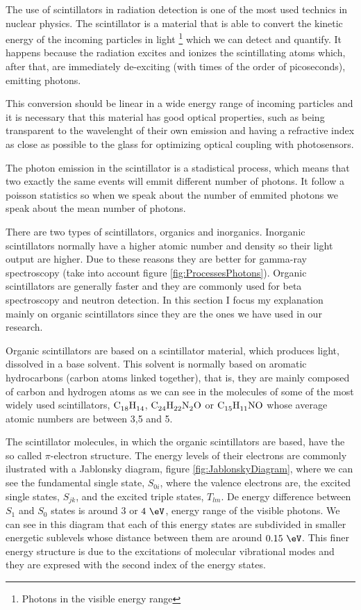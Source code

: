 The use of scintillators in radiation detection is one of the most used technics in nuclear physics. The scintillator is a material that is able to convert the kinetic energy of the incoming particles in light \footnote{Photons in the visible energy range} which we can detect and quantify. It happens because the radiation excites and ionizes the scintillating atoms which, after that, are immediately de-exciting (with times of the order of picoseconds), emitting photons.

This conversion should be linear in a wide energy range of incoming particles and it is necessary that this material has good optical properties, such as being transparent to the wavelenght of their own emission and having a refractive index as close as possible to the glass for optimizing optical coupling with photosensors.

The photon emission in the scintillator is a stadistical process, which means that two exactly the same events will emmit different number of photons. It follow a poisson statistics so when we speak about the number of emmited photons we speak about the mean number of photons.

There are two types of scintillators, organics and inorganics. Inorganic scintillators normally have a higher atomic number and density so their light output are higher. Due to these reasons they are better for gamma-ray spectroscopy (take into account figure \ref{fig:ProcessesPhotons}). Organic scintillators are generally faster and they are commonly used for beta spectroscopy and neutron detection. In this section I focus my explanation mainly on organic scintillators since they are the ones we have used in our research. 

Organic scintillators are based on a scintillator material, which produces light, dissolved in a base solvent. This solvent is normally based on aromatic hydrocarbons (carbon atoms linked together), that is, they are mainly composed of carbon and hydrogen atoms as we can see in the molecules of some of the most widely used scintillators, $\ce{C_{18}H_{14}}$, $\ce{C_{24}H_{22}N_{2}O}$ or $\ce{C_{15}H_{11}NO}$ whose average atomic numbers are between 3,5 and 5.

The scintillator molecules, in which the organic scintillators are based, have the so called $\pi$-electron structure. The energy levels of their electrons are commonly ilustrated with a Jablonsky diagram, figure \ref{fig:JablonskyDiagram}, where we can see the fundamental single state, $S_{0i}$, where the valence electrons are, the excited single states, $S_{jk}$, and the excited triple states, $T_{lm}$. De energy difference between $S_1$ and $S_0$ states is around $3$ or $4~\eV$, energy range of the visible photons. We can see in this diagram that each of this energy states are subdivided in smaller energetic sublevels whose distance between them are around $0.15~\eV$. This finer energy structure is due to the excitations of molecular vibrational modes and they are expresed with the second index of the energy states.

